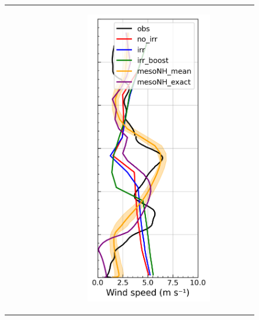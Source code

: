 \begin{figure}[hbtp]
{\begin{tabular}{@{}cccc@{}}
\begin{subfigure}[t]{0.289\textwidth}
        \end{subfigure} &
        \begin{subfigure}[t]{0.283\textwidth}
            \caption{}
            \includegraphics[width=\textwidth]{images/chap5/profiles/profile_cendrosa_wind_speed_2007_.png}

\end{subfigure}
\end{tabular}}
\end{figure}
